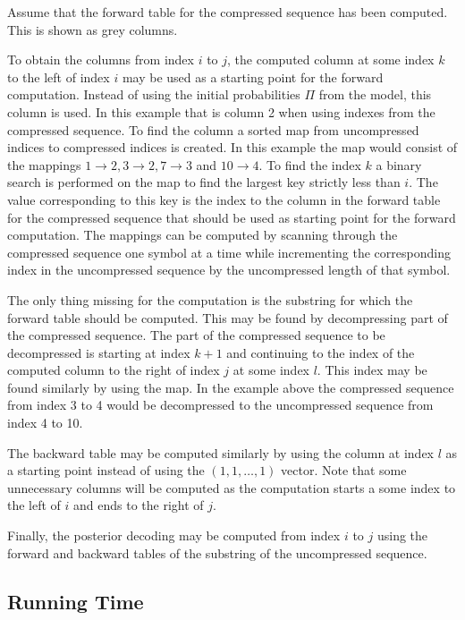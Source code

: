 Assume that the forward table for the compressed sequence has been
computed. This is shown as grey columns.

To obtain the columns from index $i$ to $j$, the computed column at some index
$k$ to the left of index $i$ may be used as a starting point for the forward
computation. Instead of using the initial probabilities $\Pi$ from the model,
this column is used. In this example that is column 2 when using indexes from
the compressed sequence. To find the column a sorted map from uncompressed
indices to compressed indices is created. In this example the map would consist
of the mappings $1 \rightarrow 2, 3 \rightarrow 2, 7 \rightarrow 3$ and
$10 \rightarrow 4$. To find the index $k$ a binary search is performed on the
map to find the largest key strictly less than $i$. The value corresponding to
this key is the index to the column in the forward table for the compressed
sequence that should be used as starting point for the forward computation. The
mappings can be computed by scanning through the compressed sequence one symbol
at a time while incrementing the corresponding index in the uncompressed
sequence by the uncompressed length of that symbol.

The only thing missing for the computation is the substring for which the
forward table should be computed. This may be found by decompressing part of
the compressed sequence. The part of the compressed sequence to be decompressed
is starting at index $k + 1$ and continuing to the index of the computed column
to the right of index $j$ at some index $l$. This index may be found
similarly by using the map. In the example above the compressed sequence from
index 3 to 4 would be decompressed to the uncompressed sequence from index 4 to
10.

The backward table may be computed similarly by using the column at index $l$
as a starting point instead of using the $(1, 1, \dots, 1)$ vector. Note that
some unnecessary columns will be computed as the computation starts a some
index to the left of $i$ and ends to the right of $j$.

Finally, the posterior decoding may be computed from index $i$ to $j$ using the
forward and backward tables of the substring of the uncompressed sequence.

\subsection{Running Time}
\label{sec:running-time-2}

